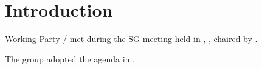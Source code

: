 
\section{Introduction}\label{introduction}



Working Party \workingParty/\studyGroup{} met during the SG\studyGroup{} meeting held in \place, \occurence, chaired by \wpChairs\assistedBy.

The group adopted the agenda in \agendaRef.
